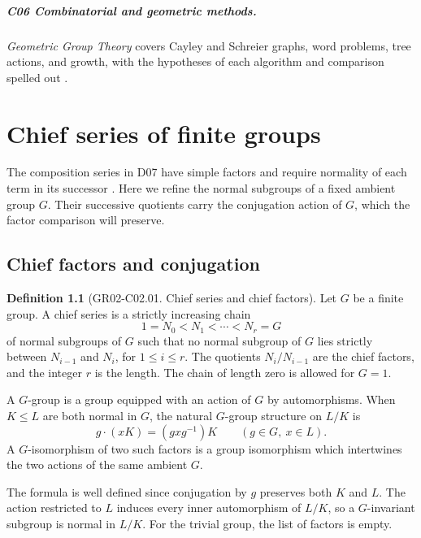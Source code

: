 \documentclass[11pt,oneside,openany]{book}
\theoremstyle{definition}
\newtheorem{definition}[theorem]{Definition}
\theoremstyle{remark}
\begin{document}
\paragraph{C06 \enspace Combinatorial and geometric methods.}
\emph{Geometric Group Theory} covers Cayley and Schreier graphs, word
problems, tree actions, and growth, with the hypotheses of each
algorithm and comparison spelled out \cite[Chs.~1--3 and~6]{geomgroup}.

\mainmatter
\chapter{Chief series of finite groups}
\label{ch:gr02-chief}

The composition series in D07 have simple factors and require
normality of each term in its successor
\cite[entries K07.06.composition\_series\_definition and
K07.06.jordan\_holder\_extension]{d07}. Here we refine the normal
subgroups of a fixed ambient group \(G\). Their successive quotients
carry the conjugation action of \(G\), which the factor comparison
will preserve.

\section{Chief factors and conjugation}

\begin{definition}[GR02-C02.01. Chief series and chief factors]
\label{def:gr02-chief-series}
Let \(G\) be a finite group. A chief series is a strictly increasing
chain
\[
  1=N_0<N_1<\cdots<N_r=G
\]
of normal subgroups of \(G\) such that no normal subgroup of \(G\)
lies strictly between \(N_{i-1}\) and \(N_i\), for \(1\le i\le r\).
The quotients \(N_i/N_{i-1}\) are the chief factors, and the integer
\(r\) is the length. The chain of length zero is allowed for \(G=1\).

A \(G\)-group is a group equipped with an action of \(G\) by
automorphisms. When \(K\le L\) are both normal in \(G\), the
natural \(G\)-group structure on \(L/K\) is
\[
  g\cdot(xK)=(gxg^{-1})K \qquad (g\in G,\ x\in L).
\]
A \(G\)-isomorphism of two such factors is a group isomorphism
which intertwines the two actions of the same ambient \(G\).
\end{definition}

The formula is well defined since conjugation by \(g\) preserves both
\(K\) and \(L\). The action restricted to \(L\) induces every inner
automorphism of \(L/K\), so a \(G\)-invariant subgroup is normal in
\(L/K\). For the trivial group, the list of factors is empty.
\end{document}
